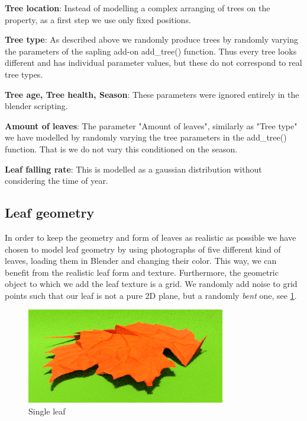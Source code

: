 \documentclass[fleqn,10pt]{SelfArx} %
\begin{document}
\textbf{Tree location}: Instead of modelling a complex arranging of trees on the property, as a first step we use only fixed positions.

\textbf{Tree type}: As described above we randomly produce trees by randomly varying the parameters of the sapling add-on add\_tree() function. Thus every tree looks different and has individual parameter values, but these do not correspond to real tree types.
 
\textbf{Tree age, Tree health, Season}: These parameters were ignored entirely in the blender scripting.
  
\textbf{Amount of leaves}: The parameter "Amount of leaves", similarly as "Tree type" we have modelled by randomly varying the tree parameters in the add\_tree() function. That is we do not vary this conditioned on the season.
 
\textbf{Leaf falling rate}: This is modelled as a gaussian distribution without considering the time of year. 

\subsection{Leaf geometry}

In order to keep the geometry and form of leaves as realistic as possible we have chosen to model leaf geometry by using photographs of five different kind of leaves, loading them in Blender and changing their color. This way, we can benefit from the realistic leaf form and texture. Furthermore, the geometric object to which we add the leaf texture is a grid. We randomly add noise to grid points such that our leaf is not a pure 2D plane, but a randomly \emph{bent} one, see \ref{fig:leaf_bend}. 

\begin{figure}[ht]\centering
\includegraphics[width=\linewidth]{Figures/leaf_bend.png}
\caption{Single leaf}
\label{fig:leaf_bend}
\end{figure}
\end{document}
